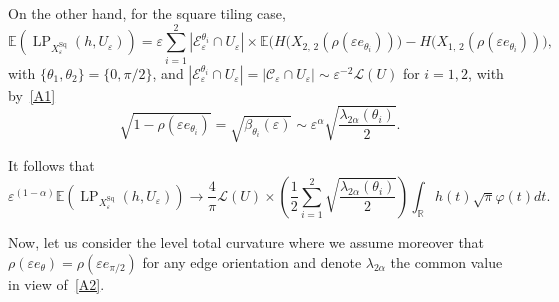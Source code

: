 \documentclass[10pt]{amsart}
\theoremstyle{definition}\newtheorem{defi}[theo]{Definition}\newtheorem{rema}[theo]{Remark}\newtheorem{exam}[theo]{Example}\newtheorem{exem}[theo]{Example}\newtheorem{nota}[theo]{Notation}
\newcommand{\R}{\mathbb{R}}
\newcommand{\E}{\mathbb{E}}
\newcommand{\eps}{\varepsilon}
\DeclareMathOperator{\LP}{LP}
\DeclareMathOperator{\Sq}{Sq}
\newcommand{\calL}{\mathcal{L}}
\newcommand{\calC}{\mathcal{C}}
\newcommand{\calE}{\mathcal{E}}
\begin{document}
On the other hand, for the square tiling case,
\[
\E\left(\LP_{X_\eps^{\Sq}}(h,U_\eps)\right)=\eps\sum_{i=1}^2|\calE_\eps^{\theta_i}\cap U_\eps|\times
\E\big(H(X_{2,\,2}(\rho(\eps e_{\theta_i}))\big) - H\big(X_{1,\,2}(\rho(\eps e_{\theta_i}))\big),
\]
with $\{\theta_1,\theta_2\}=\{0,\pi/2\}$, and $|\calE_\eps^{\theta_i}\cap U_\eps|=|\calC_\eps\cap U_\eps|\sim \eps^{-2}{\calL}(U)$ for $i=1,2$, with by~\eqref{A1}
\[
\sqrt{1-\rho(\eps e_{\theta_i})}=\sqrt{\beta_{\theta_i}(\eps)}\sim \eps^\alpha\sqrt{\frac{\lambda_{{2\alpha}}(\theta_i)}{2}}.
\]

It follows that
\[
\eps^{(1-\alpha)}\E\left(\LP_{X_\eps^{\Sq}}(h,U_\eps)\right)\longrightarrow \frac{4}{{\pi}}{\calL}(U)
\times\left(\frac{1}{2}\sum_{i=1}^2\sqrt{\frac{\lambda_{{2\alpha}}(\theta_i)}{2}}\right)\int_\R h(t){\sqrt{\pi}}\varphi(t)dt.
\]



Now, let us consider the level total curvature where we assume moreover that $\rho(\eps e_\theta)=\rho(\eps e_{\pi/2})$ for any edge orientation and denote $\lambda_{{2\alpha}}$ the common value in view of~\eqref{A2}.
\end{document}
